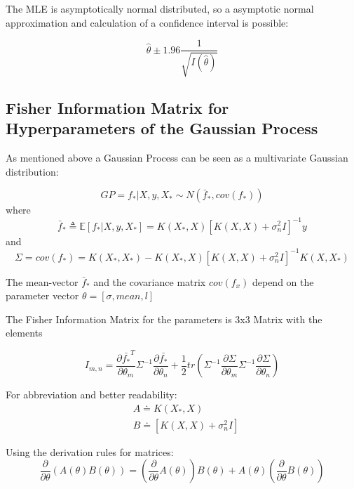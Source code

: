 \documentclass[12pt]{article}
\begin{document}
	The MLE is asymptotically normal distributed, so a asymptotic normal approximation and calculation of a confidence interval is possible:
	
	\begin{displaymath}
	\hat{\theta} \pm 1.96 \frac{1}{\sqrt{I(\hat{\theta})}} 
	\end{displaymath}
	
	
	\subsection{Fisher Information Matrix for Hyperparameters of the Gaussian Process}
	As mentioned above a Gaussian Process can be seen as a multivariate Gaussian distribution:
	
	\begin{displaymath}
	GP = f_{*}|X,y,X_{*} \sim N(\bar{f}_{*},cov(f_{*}))
	\end{displaymath}
	where 
	\begin{displaymath}
		\bar{f}_{*} \triangleq \mathbb{E}[f_{*}|X,y,X_{*}] = K(X_{*},X)[K(X,X) +\sigma^{2}_{n}I]^{-1}y
	\end{displaymath}
	and
	\begin{displaymath}
		\Sigma = cov(f_{*}) = K(X_{*},X_{*})-K(X_{*},X)[K(X,X) + \sigma^{2}_{n}I]^{-1}K(X,X_{*})
	\end{displaymath}
	
	The mean-vector $\bar{f}_{*}$ and the covariance matrix $cov(f_{x})$ depend on the parameter vector $\theta = [\sigma, mean, l]$
	
	The Fisher Information Matrix for the parameters is 3x3 Matrix with the elements
	
	\begin{displaymath}
	I_{m,n} = \frac{\partial \bar{f_{*}}^{T}}{\partial \theta_{m}}
				\Sigma^{-1}
				\frac{\partial \bar{f_{*}}}{\partial \theta_{n}}+
				\frac{1}{2}
				tr(\Sigma^{-1} \frac{\partial \Sigma}{\partial \theta_{m}} \Sigma^{-1} \frac{\partial \Sigma}{\partial \theta_{n}})
	\end{displaymath}
	
	For abbreviation and better readability: 
	\begin{align*}
	& A \doteq K(X_{*},X) \\
	& B \doteq [K(X,X) +\sigma^{2}_{n}I]
	\end{align*}
	
	Using the derivation rules for matrices:
	\begin{displaymath}
	\frac{\partial}{\partial \theta}(A(\theta)B(\theta)) = (\frac{\partial}{\partial \theta}A(\theta)) B(\theta) + A(\theta)(\frac{\partial}{\partial \theta}B(\theta))
	\end{displaymath}
	
\end{document}
